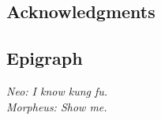 \documentclass[
	12pt, 
	]{article}
\numberwithin{equation}{section}
\theoremstyle{definition}
\theoremstyle{plain}
\theoremstyle{plain}
\theoremstyle{plain}
\begin{document}
\thispagestyle{empty}


\subsection*{Acknowledgments}

\thispagestyle{empty}


\subsection*{Epigraph}



\begin{flushright}
	
\textit{Neo: I know kung fu. \\
		Morpheus: Show me.}
\end{flushright}


\thispagestyle{empty}

\newpage


{\onehalfspacing
	\begin{abstract}
		\vspace*{0.5cm}
		
		\lipsum[1]
		
\end{abstract}
}

\thispagestyle{empty}



{
	\onehalfspacing
	\begin{abstract}
		\vspace*{0.5cm}
		
		\lipsum[1]
		
\end{abstract}
}

\thispagestyle{empty}

\newpage
\end{document}

